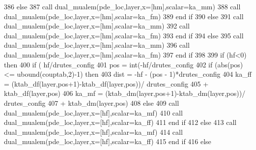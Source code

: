 \begin{DoxyCode}
{386 \textcolor{comment}{                        }\textcolor{keywordflow}{else}
387                           \textcolor{keyword}{call }dual_mualem(pde\_loc,layer,x=[hm],scalar=ka\_mm)
388                           \textcolor{keyword}{call }dual_mualem(pde\_loc,layer,x=[hm],scalar=ka\_fm)
389 \textcolor{keywordflow}{                        end if}
390                   \textcolor{keywordflow}{else}
391                         \textcolor{keyword}{call  }dual_mualem(pde\_loc,layer,x=[hm],scalar=ka\_mm)
392                         \textcolor{keyword}{call  }dual_mualem(pde\_loc,layer,x=[hm],scalar=ka\_fm)
393 \textcolor{keywordflow}{                  end if}
394                 \textcolor{keywordflow}{else}
395                         \textcolor{keyword}{call  }dual_mualem(pde\_loc,layer,x=[hm],scalar=ka\_mm)
396                         \textcolor{keyword}{call  }dual_mualem(pde\_loc,layer,x=[hm],scalar=ka\_fm)
397 \textcolor{keywordflow}{                end if}
398     
399                 \textcolor{keywordflow}{if} (hf<0) \textcolor{keywordflow}{then}
400                   \textcolor{keywordflow}{if} ( hf/drutes_config%
401                         pos = int(-hf/drutes_config%
402                         \textcolor{keywordflow}{if} (abs(pos) <= ubound(couptab,2)-1) \textcolor{keywordflow}{then}
403                           dist = -hf - (pos - 1)*drutes_config%
404                           ka\_ff = (ktab\_df(layer,pos+1)-ktab\_df(layer,pos))/
      drutes_config%
405 \textcolor{comment}{                          + ktab\_df(layer,pos)}
406 \textcolor{comment}{                          ka\_mf = (ktab\_dm(layer,pos+1)-ktab\_dm(layer,pos))/
      drutes_config%
407 \textcolor{comment}{                          + ktab\_dm(layer,pos)}
408 \textcolor{comment}{                        }\textcolor{keywordflow}{else}
409                           \textcolor{keyword}{call }dual_mualem(pde\_loc,layer,x=[hf],scalar=ka\_mf)
410                           \textcolor{keyword}{call }dual_mualem(pde\_loc,layer,x=[hf],scalar=ka\_ff)
411 \textcolor{keywordflow}{                        end if}
412                   \textcolor{keywordflow}{else}
413                           \textcolor{keyword}{call }dual_mualem(pde\_loc,layer,x=[hf],scalar=ka\_mf)
414                           \textcolor{keyword}{call }dual_mualem(pde\_loc,layer,x=[hf],scalar=ka\_ff)
415 \textcolor{keywordflow}{                  end if}
416                 \textcolor{keywordflow}{else}
}}
\end{DoxyCode}
